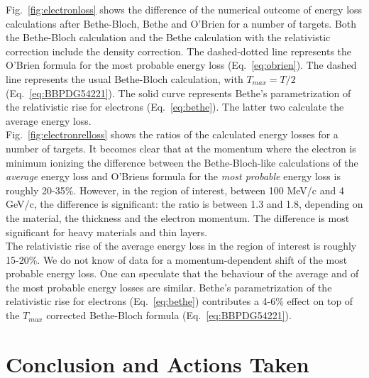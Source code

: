 Fig.~\ref{fig:electronloss} shows the difference of the numerical outcome of energy
loss calculations after Bethe-Bloch, Bethe and O'Brien for a number of targets.
Both the Bethe-Bloch calculation and the Bethe calculation with the relativistic 
correction include the density correction. The dashed-dotted line represents the O'Brien
formula for the most probable energy loss (Eq.~\ref{eq:obrien}). The dashed line 
represents the usual Bethe-Bloch calculation, with $T_{max}=T/2$ 
(Eq.~\ref{eq:BBPDG54221}). The solid curve represents Bethe's parametrization of the 
relativistic rise for electrons (Eq.~\ref{eq:bethe}). The latter two calculate the 
average energy loss.\\
Fig.~\ref{fig:electronrelloss} shows the ratios of the calculated energy losses for a 
number of targets. It becomes clear that at the momentum where the electron
is minimum ionizing the difference between the Bethe-Bloch-like calculations of the
{\em average} energy loss and O'Briens formula for the {\em most probable} energy loss
is roughly 20-35\%. However, in the region of interest, between 100 MeV/c and 4 GeV/c,
the difference is significant: the ratio is between 1.3 and 1.8, depending on the 
material, the thickness and the electron momentum. The difference is most significant for
heavy materials and thin layers.\\
The relativistic rise of the average energy loss in the region of interest is roughly 
15-20\%. We do not know of data
for a momentum-dependent shift of the most probable energy loss. One can speculate that 
the behaviour of the average and of the most probable energy losses are similar. 
Bethe's parametrization of the relativistic rise for electrons (Eq.~\ref{eq:bethe})
contributes a 4-6\% effect on top of the $T_{max}$ corrected Bethe-Bloch formula 
(Eq.~\ref{eq:BBPDG54221}).  

\section{Conclusion and Actions Taken}

